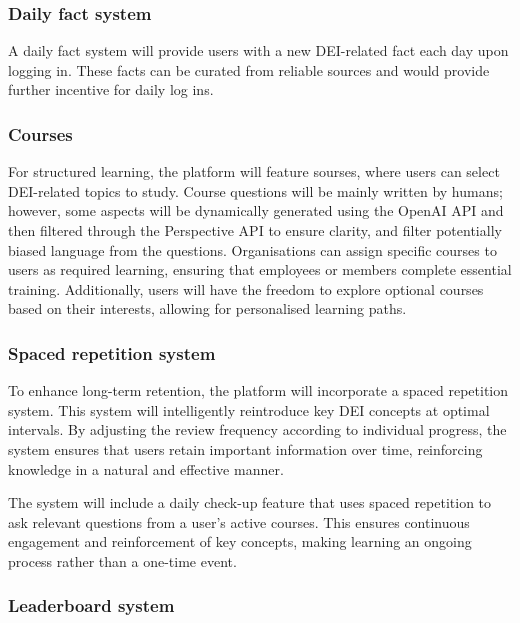\documentclass{scrartcl}
\begin{document}
\subsubsection{Daily fact system}

A daily fact system will provide users with a new DEI-related fact each day upon logging in. These facts can be curated from reliable sources and would provide further incentive for daily log ins.

\subsubsection{Courses}

For structured learning, the platform will feature sourses, where users can select DEI-related topics to study. Course questions will be mainly written by humans; however, some aspects will be dynamically generated using the OpenAI API \parencite{openai-api} and then filtered through the Perspective API \parencite{perspective-api} to ensure clarity, and filter potentially biased language from the questions. Organisations can assign specific courses to users as required learning, ensuring that employees or members complete essential training. Additionally, users will have the freedom to explore optional courses based on their interests, allowing for personalised learning paths.

\subsubsection{Spaced repetition system}

To enhance long-term retention, the platform will incorporate a spaced repetition system.
This system will intelligently reintroduce key DEI concepts at optimal intervals.
By adjusting the review frequency according to individual progress, the system ensures that users retain important information over time, reinforcing knowledge in a natural and effective manner.

\par
The system will include a daily check-up feature that uses spaced repetition to ask relevant questions from a user’s active courses.
This ensures continuous engagement and reinforcement of key concepts, making learning an ongoing process rather than a one-time event.

\subsubsection{Leaderboard system}
\end{document}
